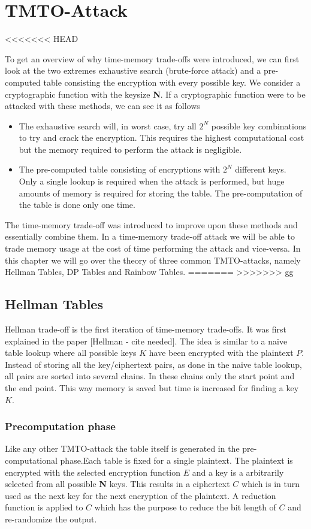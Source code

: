 \chapter{TMTO-Attack}
\label{ch:tmto}
<<<<<<< HEAD

To get an overview of why time-memory trade-offs were introduced, we
can first look at the two extremes exhaustive search (brute-force
attack) and a pre-computed table consisting the encryption with every
possible key. We consider a cryptographic function with the keysize
\textbf{N}. If a cryptographic function were to be attacked with these
methods, we can see it as follows
\begin{itemize}
\item The exhaustive search will, in worst case, try all $2^{N}$
  possible key combinations to try and crack the encryption. This
  requires the highest computational cost but the memory required to
  perform the attack is negligible.
\item The pre-computed table consisting of encryptions with $2^{N}$
  different keys. Only a single lookup is required when the attack is
  performed, but huge amounts of memory is required for storing the
  table. The pre-computation of the table is done only one time. 
\end{itemize}
The time-memory trade-off was introduced to improve upon these
methods and essentially combine them. In a time-memory trade-off
attack we will be able to trade memory usage at the cost of time
performing the attack and vice-versa. In this chapter we will go over
the theory of three common TMTO-attacks, namely Hellman Tables, DP
Tables and Rainbow Tables.
=======
>>>>>>> gg
\section{Hellman Tables}
\label{sec:hmtheory}
Hellman trade-off is the first iteration of time-memory trade-offs. It
was first explained in the paper [Hellman - cite needed].
The idea is similar to a naive table lookup where all possible keys $K$ have been encrypted with the plaintext $P$.
Instead of storing all the key/ciphertext pairs, as done in the naive
table lookup, all pairs are sorted into several chains. In these
chains only the start point and the end point. This way memory is
saved but time is increased for finding a key $K$.

\subsection{Precomputation phase} %
Like any other TMTO-attack the table itself is generated in the
pre-computational phase.Each table is fixed for a single
plaintext. The plaintext is encrypted with the selected encryption
function $E$ and a key is a arbitrarily selected from all possible \textbf{N}
keys. This results in a ciphertext $C$ which is in turn used as the
next key for the next encryption of the plaintext. A reduction
function is applied to $C$ which has the purpose to reduce the bit
length of $C$ and re-randomize the output.


